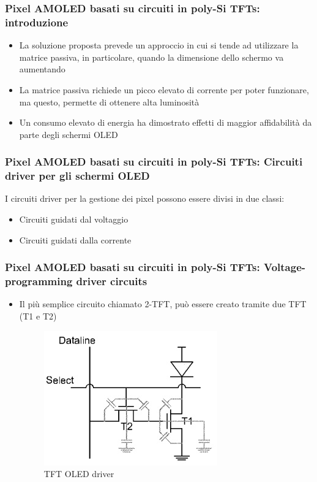 \documentclass[12pt]{beamer}
\begin{document}
	\begin{frame}
		\frametitle{Pixel AMOLED basati su circuiti in poly-Si TFTs: introduzione}
		\begin{itemize}
			\item La soluzione proposta prevede un approccio in cui si tende ad utilizzare la matrice passiva, in particolare, quando la dimensione dello schermo va aumentando
			\pause
			\item La matrice passiva richiede un picco elevato di corrente per poter funzionare, ma questo, permette di ottenere alta luminosità
			\pause
			\item Un consumo elevato di energia ha dimostrato effetti di maggior affidabilità da parte degli schermi OLED
		\end{itemize}
	\end{frame}
	\begin{frame}
		\frametitle{Pixel AMOLED basati su circuiti in poly-Si TFTs: Circuiti driver per gli schermi OLED}
		I circuiti driver per la gestione dei pixel possono essere divisi in due classi:
		\begin{itemize}
			\item Circuiti guidati dal voltaggio
			\pause
			\item Circuiti guidati dalla corrente
		\end{itemize}
	\end{frame}
	\begin{frame}
		\frametitle{Pixel AMOLED basati su circuiti in poly-Si TFTs: Voltage-programming driver circuits}
		\begin{itemize}
			\item Il più semplice circuito chiamato 2-TFT, può essere creato tramite due TFT (T1 e T2)
			\begin{figure}
				\centering
				\includegraphics[width=0.7\linewidth]{FISICA/tft_oled_driver}
				\caption{TFT OLED driver}
				\label{fig:tftoleddriver}
			\end{figure}
		\end{itemize}
	\end{frame}
\end{document}
